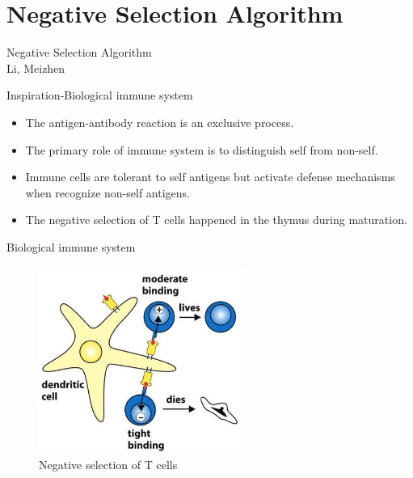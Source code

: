 \section{Negative Selection Algorithm}

\begin{frame}
\begin{center}
\begin{spacing}{2.0}
 \Huge {Negative Selection Algorithm}
 \large {\\Li, Meizhen}
\end{spacing}
\end{center}
\end{frame}


\begin{frame}{Inspiration-Biological immune system}
  \begin{itemize}
  \item {
    The antigen-antibody reaction is an exclusive process.
  }
  \item {
    The primary role of immune system is to distinguish self from non-self.
  }
  \item {
    Immune cells are tolerant to self antigens but activate defense mechanisms when recognize non-self antigens.   
  }
  \item {
    The negative selection of T cells happened in the thymus during maturation.
  }
  \end{itemize}
\end{frame}

\begin{frame}{Biological immune system}
  \begin{figure}[hb]
  \centering
  \includegraphics[width=0.6\textwidth]{img/NST.JPG}
  \caption{Negative selection of T cells}
  \end{figure}
\end{frame}

